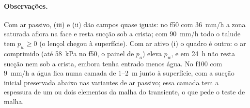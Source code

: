 \paragraph{Observações.} Com ar passivo, (iii) e (ii) dão campos quase iguais: no f50 com 36~mm/h a zona saturada
aflora na face e resta sucção sob a crista; com 90~mm/h todo o talude tem $p_w \ge 0$ (o lençol chegou à superfície).
Com ar ativo (i) o quadro é outro: o ar comprimido (até 58~kPa no f50, o painel de $p_a$) eleva $p_w$, e em 24~h não
resta sucção nem sob a crista, embora tenha entrado menos água. No f100 com 9~mm/h a água fica numa camada de 1--2~m
junto à superfície, com a sucção inicial preservada abaixo nas variantes de ar passivo; essa camada tem a espessura de
um ou dois elementos da malha do transiente, o que pede o teste de malha.
